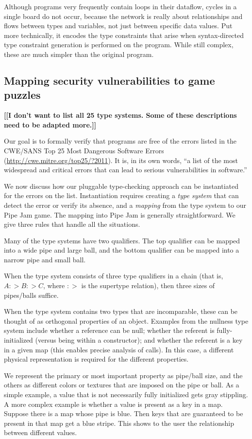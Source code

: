 \documentclass[preprint]{sig-alternate}
\def\<#1>{\codeid{#1}}
\newcommand{\codeid}[1]{\ifmmode{\mbox{\ttfamily{#1}}}\else{\ttfamily #1}\fi}
\newcommand{\todo}[1]{{\color{red}\bfseries [[#1]]}}
\let\Itemize =\itemize
\def\Nospacing{\itemsep=0pt\topsep=0pt\partopsep=0pt\parskip=0pt\parsep=0pt}
\renewenvironment{itemize}{\Itemize\Nospacing}{\endlist}
\begin{document}
Although programs very frequently contain loops in their dataflow,
cycles in a single board do not occur, because the network is really
about relationships and flows between types and variables, not just
between specific data values.  Put more technically, it encodes the
type constraints that arise when syntax-directed type constraint
generation is performed on the program.  While still complex, these
are much simpler than the original program.


\subsection{Mapping security vulnerabilities to game puzzles}

\todo{I don't want to list all 25 type systems. Some of these
  descriptions need to be adapted more.}

Our goal is to formally verify that programs are free of the errors
listed in the CWE/SANS Top 25 Most Dangerous Software Errors
(\url{http://cwe.mitre.org/top25/?2011}).  It is, in its own words,
``a list of the most widespread and critical errors that can lead to
serious vulnerabilities in software.''

We now discuss how our pluggable type-checking approach can be
instantiated for the errors on the list.  Instantiation requires
creating a \emph{type system} that can detect the error or verify its
absence, and a \emph{mapping} from the type system to our Pipe Jam
game.  The mapping into Pipe Jam is generally straightforward.  We
give three rules that handle all the situations.
%
\begin{itemize}
\item
  Many of the type systems have two qualifiers.  The top qualifier can be
  mapped into a wide pipe and large ball, and the bottom qualifier can be
  mapped into a narrow pipe and small ball.
\item
  When the type system consists of three type qualifiers in a chain (that
  is, $A :> B :> C$, where $:>$ is the supertype relation), then three
  sizes of pipes/balls suffice.
\item
  When the type system contains two types that are incomparable, these
  can be thought of as orthogonal properties of an object.  Examples
  from the nullness type system include whether a reference can be
  null; whether the referent is fully-initialized (versus being
  \<this> within a constructor); and whether the referent is a key in
  a given map (this enables precise analysis of \<Map.get()> calls).
  In this case, a different physical representation is required for
  the different properties.

  We represent the primary or most important property as pipe/ball
  size, and the others as different colors or textures that are
  imposed on the pipe or ball.  As a simple example, a value that is
  not necessarily fully initialized gets gray stippling.  A more
  complex example is whether a value is present as a key in a map.
  Suppose there is a map whose pipe is blue.  Then keys that are
  guaranteed to be present in that map get a blue stripe.  This shows
  to the user the relationship between different values.
\end{itemize}
\end{document}
